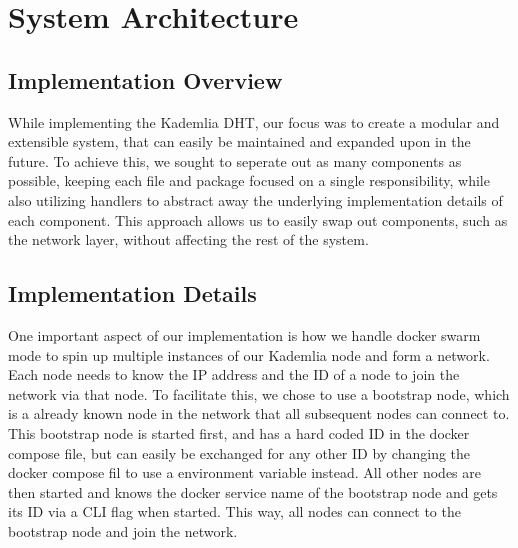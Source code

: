 \section{System Architecture}

\subsection{Implementation Overview}

While implementing the Kademlia DHT, our focus was to create a modular and extensible system, that can easily be maintained and expanded upon in the future.
To achieve this, we sought to seperate out as many components as possible, keeping each file and package focused on a single responsibility, while also utilizing 
handlers to abstract away the underlying implementation details of each component. This approach allows us to easily swap out components, such as the network layer, 
without affecting the rest of the system.

\subsection{Implementation Details}
One important aspect of our implementation is how we handle docker swarm mode to spin up multiple instances of our Kademlia node and form a network. Each node needs to know the IP address and the ID of a node to join the network via that node. To facilitate this, we chose to use a bootstrap node, which is a already known node in the network that all subsequent nodes can connect to. This bootstrap node is started first, and has a hard coded ID in the docker compose file, but can easily be exchanged for any other ID by changing the docker compose fil to use a environment variable instead. All other nodes are then started and knows the docker service name of the bootstrap node and gets its ID via a CLI flag when started. This way, all nodes can connect to the bootstrap node and join the network.



